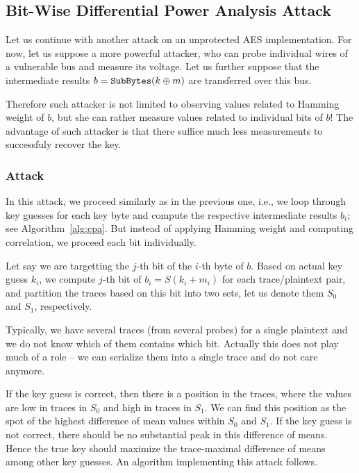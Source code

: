 
\subsection{Bit-Wise Differential Power Analysis Attack}

Let us continue with another attack on an unprotected AES implementation. For now, let us suppose a more powerful attacker, who can probe individual wires of a vulnerable bus and measure its voltage. Let us further suppose that the intermediate results $b = \texttt{SubBytes}(k\oplus m)$ are transferred over this bus.

Therefore such attacker is not limited to observing values related to Hamming weight of $b$, but she can rather measure values related to individual bits of $b$! The advantage of such attacker is that there suffice much less measurements to successfuly recover the key.

\subsubsection{Attack}
	
	In this attack, we proceed similarly as in the previous one, i.e., we loop through key guesses for each key byte and compute the respective intermediate results $b_i$; see Algorithm~\ref{alg:cpa}. But instead of applying Hamming weight and computing correlation, we proceed each bit individually.
	
	Let say we are targetting the $j$-th bit of the $i$-th byte of $b$. Based on actual key guess $k_i$, we compute $j$-th bit of $b_i = S(k_i+m_i)$ for each trace/plaintext pair, and partition the traces based on this bit into two sets, let us denote them $S_0$ and $S_1$, respectively.
	
	\begin{note}
	\label{note:concattraces}
		Typically, we have several traces (from several probes) for a single plaintext and we do not know which of them contains which bit. Actually this does not play much of a role -- we can serialize them into a single trace and do not care anymore.
	\end{note}
	
	If the key guess is correct, then there is a position in the traces, where the values are low in traces in $S_0$ and high in traces in $S_1$. We can find this position as the spot of the highest difference of mean values within $S_0$ and $S_1$. If the key guess is not correct, there should be no substantial peak in this difference of means. Hence the true key should maximize the trace-maximal difference of means among other key guesses. An algorithm implementing this attack follows.
	

